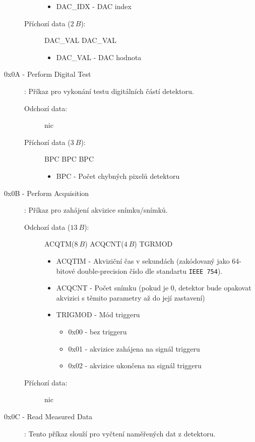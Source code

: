 \begin{description}
\begin{description}
				\begin{itemize}
					\item DAC\_IDX - DAC index
				\end{itemize}
			\item[Příchozí data ($2~B$):] DAC\_VAL DAC\_VAL
				\begin{itemize}
					\item DAC\_VAL - DAC hodnota
				\end{itemize}
		\end{description}
	\item[0x0A - Perform Digital Test]:
		Příkaz pro vykonání testu digitálních částí detektoru.
		\begin{description}
			\item[Odchozí data:] nic
			\item[Příchozí data ($3~B$):] BPC BPC BPC
				\begin{itemize}
					\item BPC - Počet chybných pixelů detektoru
				\end{itemize}
		\end{description}
	\item[0x0B - Perform Acquisition]:
		Příkaz pro zahájení akvizice snímku/snímků.
		\begin{description}
			\item[Odchozí data ($13~B$):] ACQTM($8~B$) ACQCNT($4~B$) TGRMOD
				\begin{itemize}
					\item ACQTIM - Akviziční čas v sekundách (zakódovaný jako 64-bitové double-precision číslo dle standartu \texttt{IEEE 754}).
					\item ACQCNT - Počet snímku (pokud je 0, detektor bude opakovat akvizici s těmito parametry až do její zastavení)
					\item TRIGMOD - Mód triggeru
						\begin{itemize}
							\item 0x00 - bez triggeru
							\item 0x01 - akvizice zahájena na signál triggeru
							\item 0x02 - akvizice ukončena
							 na signál triggeru
						\end{itemize}
				\end{itemize}
			\item[Příchozí data:] nic
		\end{description}
	\item[0x0C - Read Measured Data]:
		Tento příkaz slouží pro vyčtení naměřených dat z detektoru.

\end{description}
